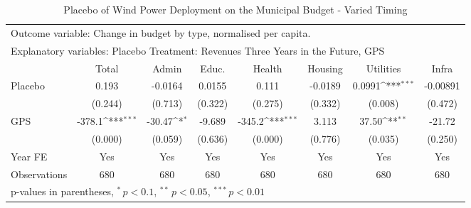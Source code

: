 \begin{table}[htbp]\centering
\def\sym#1{\ifmmode^{#1}\else\(^{#1}\)\fi}
\caption{Placebo of Wind Power Deployment on the Municipal Budget - Varied Timing \label{budgetplacebo}}
\begin{tabular*}{\hsize}{@{\hskip\tabcolsep\extracolsep\fill}l*{7}{c}}
\toprule
\multicolumn{7}{l}{\parbox{11cm}{Outcome variable: Change in budget by type, normalised per capita. }} \\ \multicolumn{7}{l}{\parbox{11cm}{Explanatory variables: Placebo Treatment: Revenues Three Years in the Future, GPS}} \\ \midrule & Total & Admin & Educ. & Health & Housing & Utilities & Infra \\ \toprule
\addlinespace Placebo&       0.193         &     -0.0164         &      0.0155         &       0.111         &     -0.0189         &      0.0991\sym{***}&    -0.00891         \\
            &     (0.244)         &     (0.713)         &     (0.322)         &     (0.275)         &     (0.332)         &     (0.008)         &     (0.472)         \\\addlinespace
GPS         &      -378.1\sym{***}&      -30.47\sym{*}  &      -9.689         &      -345.2\sym{***}&       3.113         &       37.50\sym{**} &      -21.72         \\
            &     (0.000)         &     (0.059)         &     (0.636)         &     (0.000)         &     (0.776)         &     (0.035)         &     (0.250)         \\\addlinespace
\midrule
\addlinespace Year FE&         Yes         &         Yes         &         Yes         &         Yes         &         Yes         &         Yes         &         Yes         \\
\addlinespace \midrule \addlinespace Observations&         680         &         680         &         680         &         680         &         680         &         680         &         680         \\
\bottomrule
\multicolumn{8}{l}{\footnotesize p-values in parentheses, $^{*}\, p<0.1$, $^{**}\, p<0.05$, $^{***}\, p<0.01$}\\
\end{tabular*}
\end{table}
